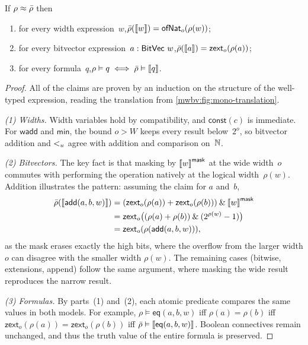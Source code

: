 \begin{lemma}[Correspondence]\label{mwbv:lem:correspondence}
If $\rho \approx \bar{\rho}$ then
\begin{enumerate}
  \item for every width expression~$w$,\quad $\bar{\rho}(\left\llbracket w \right\rrbracket) = \mathsf{ofNat}_o(\rho(w))$;
  \item for every bitvector expression~$a : \mathsf{BitVec}~{w}$,\quad $\bar{\rho}(\left\llbracket a \right\rrbracket) = \mathsf{zext}_o(\rho(a))$;
  \item for every formula~$q$,\quad $\rho \vDash q \iff \bar{\rho} \vDash \left\llbracket q \right\rrbracket$.
\end{enumerate}
\end{lemma}
\begin{proof}
All of the claims are proven by an induction on the structure of the well-typed expression,
reading the translation from \cref{mwbv:fig:mono-translation}.

\emph{(1) Widths.} Width variables hold by compatibility, and
$\textsf{const}(c)$ is immediate. For $\textsf{wadd}$ and $\textsf{min}$, the
bound $o > W$ keeps every result below~$2^o$, so bitvector addition and
$<_u$ agree with addition and comparison on~$\mathbb N$.

\emph{(2) Bitvectors.} The key fact is that masking by $\left\llbracket w \right\rrbracket^{\mathsf{mask}}$ at the
wide width~$o$ commutes with performing the operation natively at the logical
width~$\rho(w)$. Addition illustrates the pattern: assuming the claim for $a$
and~$b$,
\noindent
\begin{align*}
  \bar{\rho}(\left\llbracket \textsf{add}(a,b,w) \right\rrbracket) &= (\mathsf{zext}_o(\rho(a)) + \mathsf{zext}_o(\rho(b))) \mathbin{\&} \left\llbracket w \right\rrbracket^{\mathsf{mask}} \\
  &= \mathsf{zext}_o\big((\rho(a) + \rho(b)) \mathbin{\&} (2^{\rho(w)} - 1)\big) \\
  &= \mathsf{zext}_o(\rho(\textsf{add}(a,b,w))),
\end{align*}
as the mask erases exactly the high bits, where the overflow from the larger width $o$
can disagree with the smaller width $\rho(w)$. The remaining cases (bitwise, extensions, append)
follow the same argument, where masking the wide result reproduces the narrow result.

\emph{(3) Formulas.} By parts~(1) and~(2), each atomic predicate compares the
same values in both models. For example, $\rho \vDash \textsf{eq}(a,b,w)$ iff
$\rho(a) = \rho(b)$ iff $\mathsf{zext}_o(\rho(a)) = \mathsf{zext}_o(\rho(b))$ iff
$\bar{\rho} \vDash \left\llbracket \textsf{eq}(a,b,w) \right\rrbracket$. Boolean connectives
remain unchanged, and thus the truth value of the entire formula is preserved.
\end{proof}

